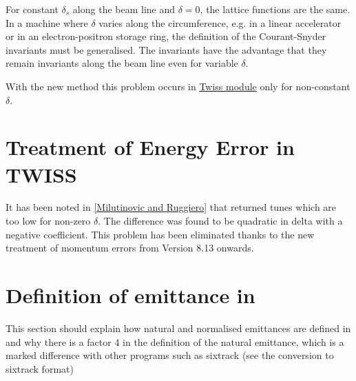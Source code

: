 For constant $\delta_s$ along the beam line and $\delta = 0$, the
lattice functions are the same. In a machine where $\delta$ varies along
the circumference, e.g. in a linear accelerator or in an
electron-positron storage ring, the definition of the Courant-Snyder
invariants must be generalised. The \madeight invariants have the advantage
that they remain invariants along the beam line even for variable $\delta$.  

With the new method this problem occurs in
\href{../twiss/twiss.html}{Twiss module} only for non-constant $\delta$.   

\section{Treatment of Energy Error in TWISS} 
It has been noted in \href{bibliography.html#ruggiero}{[Milutinovic and
    Ruggiero]} that \madeight returned tunes which are too low for non-zero
$\delta$. The difference was found to be quadratic in delta with a negative
coefficient. This problem has been eliminated thanks to the new
treatment  of momentum errors from \madeight Version 8.13 onwards.   

\section{Definition of emittance in \madx}
This section should explain how natural and normalised emittances are
defined in \madx and why there is a factor 4 in the definition of the
natural emittance, which is a marked difference with other programs such
as sixtrack (see the conversion to sixtrack format)


